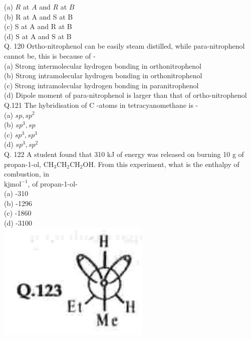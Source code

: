 \documentclass[10pt]{article}
\begin{document}
(a) $R$ at $A$ and $R$ at $B$\\
(b) R at A and S at B\\
(c) S at A and R at B\\
(d) S at A and S at B\\
Q. 120 Ortho-nitrophenol can be easily steam distilled, while para-nitrophenol cannot be, this is because of -\\
(a) Strong intermolecular hydrogen bonding in orthonitrophenol\\
(b) Strong intramolecular hydrogen bonding in orthonitrophenol\\
(c) Strong intramolecular hydrogen bonding in paranitrophenol\\
(d) Dipole moment of para-nitrophenol is larger than that of ortho-nitrophenol\\
Q.121 The hybridisation of C -atoms in tetracyanomethane is -\\
(a) $s p, s p^{2}$\\
(b) $s p^{3}, s p$\\
(c) $s p^{3}, s p^{3}$\\
(d) $s p^{3}, s p^{2}$\\
Q. 122 A student found that 310 kJ of energy was released on burning 10 g of propan-1-ol, $\mathrm{CH}_{3} \mathrm{CH}_{2} \mathrm{CH}_{2} \mathrm{OH}$. From this experiment, what is the enthalpy of combustion, in\\
$\mathrm{kjmol}^{-1}$, of propan-1-ol-\\
(a) -310\\
(b) -1296\\
(c) -1860\\
(d) -3100\\
\includegraphics[max width=\textwidth, center]{2025_01_28_8470952b98110cec3aabg-142(1)}\\
\end{document}
